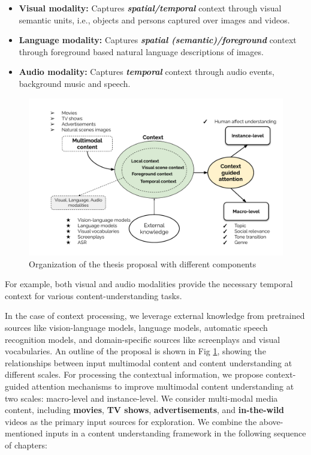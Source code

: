 \begin{itemize}
    \item  \textbf{Visual modality:} Captures \textbf{\textit{spatial/temporal}} context through visual semantic units, i.e., objects and persons captured over images and videos.
    \item  \textbf{Language modality:} Captures \textbf{\textit{spatial (semantic)/foreground}} context through foreground based natural language descriptions of images.
    \item  \textbf{Audio modality:} Captures \textbf{\textit{temporal}} context through audio events, background music and speech.
\end{itemize}

\begin{figure}[h!]
    \centering
        \includegraphics[width=\textwidth]{figures/Overview_diagram.pdf}
        \caption{Organization of the thesis proposal with different components}
        \label{proposalorganization}
\end{figure}

For example, both visual and audio modalities provide the necessary temporal context for various content-understanding tasks.
\par 
In the case of context processing, we leverage external knowledge from pretrained sources like vision-language models, language models, automatic speech recognition models, and domain-specific sources like screenplays and visual vocabularies. 
An outline of the proposal is shown in Fig \ref{proposalorganization}, showing the relationships between input multimodal content and content understanding at different scales. For processing the contextual information, we propose context-guided attention mechanisms to improve multimodal content understanding at two scales: macro-level and instance-level. We consider multi-modal media content, including \textbf{movies}, \textbf{TV shows}, \textbf{advertisements}, and \textbf{in-the-wild} videos as the primary input sources for exploration.
We combine the above-mentioned inputs in a content understanding framework in the following sequence of chapters:

